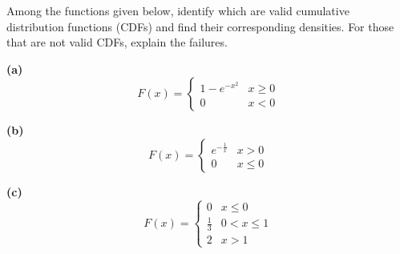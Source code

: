 \begin{exercise}
Among the functions given below, identify which are valid cumulative distribution functions (CDFs) and find their corresponding densities. For those that are not valid CDFs, explain the failures.

\textbf{(a) } 
\[
    F(x) = 
    \begin{cases} 
    1 - e^{-x^2} & x \geq 0 \\ 
    0 & x < 0 
    \end{cases}
\]


\textbf{(b) } 
\[
    F(x) = 
    \begin{cases} 
    e^{-\frac{1}{x}} & x > 0 \\ 
    0 & x \leq 0 
    \end{cases}
\]

\textbf{(c) } 
\[
    F(x) = 
    \begin{cases} 
    0 & x \leq 0 \\ 
    \frac{1}{3} & 0 < x \leq 1 \\ 
    2 & x > 1 
    \end{cases}
\]

\end{exercise}


